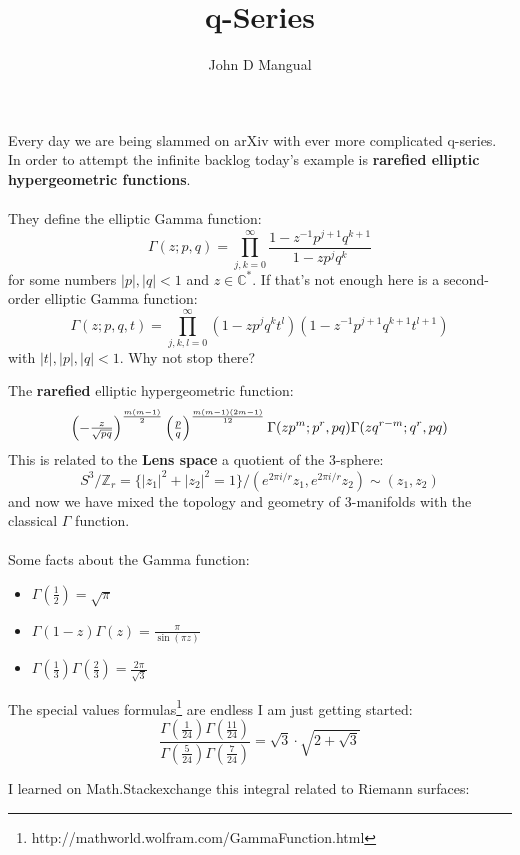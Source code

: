 \documentclass[12pt]{article}
\title{\textbf{ q-Series }}
\author{John D Mangual}
\date{}
\begin{document}
\selectfont \fontsize{24}{30}\selectfont

\maketitle

\noindent Every day we are being slammed on arXiv with ever more complicated q-series.  In order to attempt the infinite backlog today's example is \textbf{rarefied elliptic hypergeometric functions}.  \\ \\ 
They define the elliptic Gamma function:
$$ \Gamma(z; p, q) = \prod_{j,k=0}^\infty
\frac{1 - z^{-1} p^{j+1}q^{k+1}}{1 - z p^j q^k} $$
for some numbers $|p|, |q| < 1 $ and $z \in \mathbb{C}^\ast$.  If that's not enough here is a second-order elliptic Gamma function:
$$ \Gamma(z; p, q, t) = \prod_{j,k,l=0}^\infty
(1 - z p^j q^k t^l)(1 - z^{-1}p^{j+1}q^{k+1}t^{l+1}) $$ with $|t|, |p| , |q| < 1$.  \hfill Why not stop there?
\newpage

\noindent The \textbf{rarefied} elliptic hypergeometric function:
$$ \small \left( - \tfrac{z}{\sqrt{pq}} \right)^{\frac{m(m-1)}{2}}
\left(  \tfrac{p}{q} \right)^{\frac{m(m-1)(2m-1)}{12}}
\Gamma( zp^m ; p^r, pq)\Gamma(z q^{r-m}; q^r, pq) $$
This is related to the {\color{blue!50!white}\textbf{Lens space}} a quotient of the 3-sphere:
$$  S^3/\mathbb{Z}_r = \{ |z_1|^2 + |z_2|^2 = 1 \}/ (e^{2\pi i/r}z_1, e^{2\pi i / r}z_2) \sim (z_1, z_2)$$
and now we have mixed the topology and geometry of 3-manifolds with the classical $\Gamma$ function.  \\ \\ 
Some facts about the Gamma function:
\begin{itemize}
\item $\Gamma(\frac{1}{2}) = \sqrt{\pi}$
\item $\Gamma(1-z) \Gamma(z) = \frac{\pi}{\sin(\pi z)}$
\item $\Gamma(\frac{1}{3})\Gamma(\frac{2}{3}) = \frac{2\pi}{\sqrt{3}} $
\end{itemize} 
The special values formulas\footnote{http://mathworld.wolfram.com/GammaFunction.html} are endless I am just getting started:
$$ \frac{\Gamma(\frac{1}{24})\Gamma(\frac{11}{24})}{\Gamma(\frac{5}{24})\Gamma(\frac{7}{24})} = \sqrt{3}\cdot  \sqrt{2 + \sqrt{3}} $$

\newpage

I learned on Math.Stackexchange this integral related to Riemann surfaces:
\end{document}
